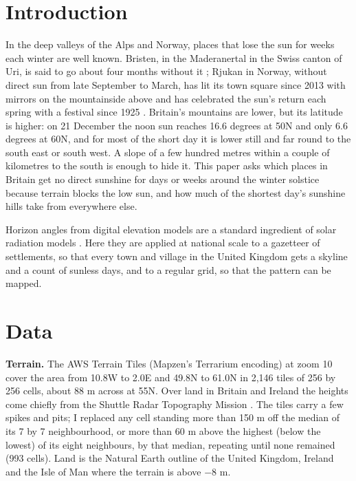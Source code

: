 \documentclass[11pt,a4paper]{article}
\begin{document}
\section{Introduction}
In the deep valleys of the Alps and Norway, places that lose the sun for weeks each winter are well known. Bristen, in the Maderanertal in the Swiss canton of Uri, is said to go about four months without it \citep{bluewin}; Rjukan in Norway, without direct sun from late September to March, has lit its town square since 2013 with mirrors on the mountainside above \citep{opn2013} and has celebrated the sun's return each spring with a festival since 1925 \citep{rjukan}. Britain's mountains are lower, but its latitude is higher: on 21 December the noon sun reaches 16.6 degrees at 50\textdegree{}N and only 6.6 degrees at 60\textdegree{}N, and for most of the short day it is lower still and far round to the south east or south west. A slope of a few hundred metres within a couple of kilometres to the south is enough to hide it. This paper asks which places in Britain get no direct sunshine for days or weeks around the winter solstice because terrain blocks the low sun, and how much of the shortest day's sunshine hills take from everywhere else.

Horizon angles from digital elevation models are a standard ingredient of solar radiation models \citep{dozier1981,hofierka2002}. Here they are applied at national scale to a gazetteer of settlements, so that every town and village in the United Kingdom gets a skyline and a count of sunless days, and to a regular grid, so that the pattern can be mapped.

\section{Data}
\textbf{Terrain.} The AWS Terrain Tiles (Mapzen's Terrarium encoding) at zoom 10 cover the area from 10.8\textdegree{}W to 2.0\textdegree{}E and 49.8\textdegree{}N to 61.0\textdegree{}N in 2,146 tiles of 256 by 256 cells, about 88 m across at 55\textdegree{}N. Over land in Britain and Ireland the heights come chiefly from the Shuttle Radar Topography Mission \citep{farr2007}. The tiles carry a few spikes and pits; I replaced any cell standing more than 150 m off the median of its 7 by 7 neighbourhood, or more than 60 m above the highest (below the lowest) of its eight neighbours, by that median, repeating until none remained (993 cells). Land is the Natural Earth outline of the United Kingdom, Ireland and the Isle of Man where the terrain is above $-8$ m.
\end{document}
